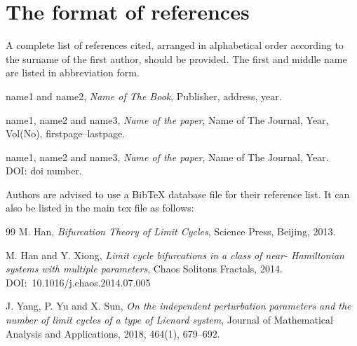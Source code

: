\documentclass{jnma}
\begin{document}
\section*{The format of references}
A complete list of references cited, arranged in alphabetical order according to the surname of the first
author, should be provided. The first and middle name are listed in abbreviation form.

\vskip 3mm
\vskip 2mm
\noindent name1 and name2,  {\em Name of The Book}, Publisher, address, year.

\vskip 3mm
\vskip 2mm
\noindent name1, name2 and name3, {\em Name of the paper}, Name of The Journal, Year, Vol(No), firstpage--lastpage.\par
\vskip 2mm
\par
\vskip 2mm
\noindent name1, name2 and name3, {\em Name of the paper}, Name of The Journal, Year. \\
DOI: doi number.


%

Authors are advised to use a BibTeX database file for their reference list.
 It can also be listed in the main tex file as follows:

\begin{thebibliography}{99}
M. Han,  {\em Bifurcation Theory of Limit Cycles}, Science Press, Beijing, 2013.

M. Han and Y. Xiong, {\em Limit cycle bifurcations in a class of near-
Hamiltonian systems with multiple parameters}, Chaos Solitons Fractals, 2014. \\
DOI:~10.1016/j.chaos.2014.07.005


J. Yang, P. Yu and X. Sun, {\em On the independent perturbation parameters and the number of limit cycles of a type of Lienard system}, Journal of Mathematical Analysis and Applications, 2018, 464(1),  679--692.



\end{thebibliography}
\end{document}
